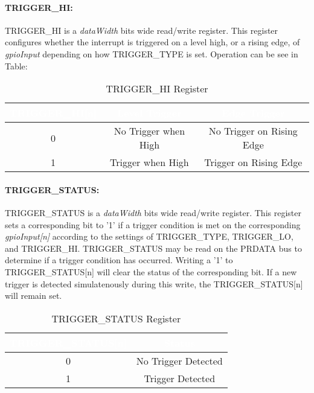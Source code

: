\paragraph{TRIGGER\_HI:}
TRIGGER\_HI is a \textit{dataWidth} bits wide read/write register. This register configures whether the interrupt is triggered on a level high, or a rising edge, 
of \textit{gpioInput} depending on how TRIGGER\_TYPE is set. Operation can be see in Table:
\begin{table}[h]
  \centering
  \begin{tabular}{|c|c|c|}
      \hline
      \rowcolor{dark-gray}  %
      \textcolor{white}{\textbf{TRIGGER\_HI[n]}} & \textcolor{white}{\textbf{Level Trigger}} & \textcolor{white}{\textbf{Edge Trigger}} \\ \hline
      0 & No Trigger when High & No Trigger on Rising Edge\\ \hline
      1 & Trigger when High & Trigger on Rising Edge\\ \hline
  \end{tabular}
  \caption{TRIGGER\_HI Register}
\end{table}

\paragraph{TRIGGER\_STATUS:}
TRIGGER\_STATUS is a \textit{dataWidth} bits wide read/write register. This register sets a corresponding bit to '1' if a trigger condition is met on
the corresponding \textit{gpioInput[n]} according to the settings of TRIGGER\_TYPE, TRIGGER\_LO, and TRIGGER\_HI.
\newline
\newline
TRIGGER\_STATUS may be read on the PRDATA bus to determine if a trigger condition has occurred. Writing a '1' to TRIGGER\_STATUS[n] will clear the 
status of the corresponding bit. If a new trigger is detected simulatenously during this write, the TRIGGER\_STATUS[n] will remain set.
\begin{table}[h]
  \centering
  \begin{tabular}{|c|c|}
      \hline
      \rowcolor{dark-gray}  %
      \textcolor{white}{\textbf{TRIGGER\_STATUS[n]}} & \textcolor{white}{\textbf{Status}} \\ \hline
      0 & No Trigger Detected \\ \hline
      1 & Trigger Detected\\ \hline
  \end{tabular}
  \caption{TRIGGER\_STATUS Register}
\end{table}

